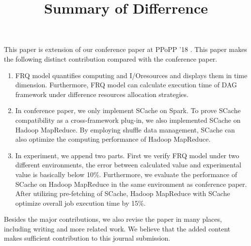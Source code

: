 \documentclass [14pt,journal,compsoc]{article}
\begin{document}
\title{Summary of Differrence}
\maketitle

This paper is extension of our conference paper at PPoPP '18 \cite{fu2018efficient}. 
This paper makes the following distinct contribution compared with the conference paper.

\begin{enumerate}
\item 
FRQ model quantifies computing and I/Oresources and displays them in time dimension. 
Furthermore, FRQ model can calculate execution time of DAG framework under difference resources allocation strategies. 
\item 
In conference paper, we only implement SCache on Spark. To prove SCache compatibility as a cross-framework plug-in, we also implemented SCache on Hadoop MapReduce. 
By employing shuffle data management, SCache can also optimize the computing performance of Hadoop MapReduce.
\item
In experiment, we append two parts. First we verify FRQ model under two different environments, the error between calculated value and experimental value is basically below 10\%. Furthermore, we evaluate the performance of SCache on Hadoop MapReduce in the same environment as conference paper.
After utilizing pre-fetching of SCache, Hadoop MapReduce with SCache optimize overall job execution time by 15\%.
\end{enumerate}

Besides the major contributions, we also revise the paper in many places, including writing and more related work. We believe that the added content makes sufficient contribution to this journal submission.



\end{document}
